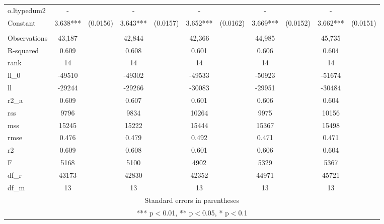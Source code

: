 \documentclass[]{article}
\begin{document}
\begin{tabular}{lcccccccccc}
o.ltypedum2 & - &  & - &  & - &  & - &  & - &  \\
Constant & 3.638*** & (0.0156) & 3.643*** & (0.0157) & 3.652*** & (0.0162) & 3.669*** & (0.0152) & 3.662*** & (0.0151) \\
 &  &  &  &  &  &  &  &  &  &  \\
Observations & 43,187 &  & 42,844 &  & 42,366 &  & 44,985 &  & 45,735 &  \\
R-squared & 0.609 &  & 0.608 &  & 0.601 &  & 0.606 &  & 0.604 &  \\
rank & 14 &  & 14 &  & 14 &  & 14 &  & 14 &  \\
ll\_0 & -49510 &  & -49302 &  & -49533 &  & -50923 &  & -51674 &  \\
ll & -29244 &  & -29266 &  & -30083 &  & -29951 &  & -30484 &  \\
r2\_a & 0.609 &  & 0.607 &  & 0.601 &  & 0.606 &  & 0.604 &  \\
rss & 9796 &  & 9834 &  & 10264 &  & 9975 &  & 10156 &  \\
mss & 15245 &  & 15222 &  & 15444 &  & 15367 &  & 15498 &  \\
rmse & 0.476 &  & 0.479 &  & 0.492 &  & 0.471 &  & 0.471 &  \\
r2 & 0.609 &  & 0.608 &  & 0.601 &  & 0.606 &  & 0.604 &  \\
F & 5168 &  & 5100 &  & 4902 &  & 5329 &  & 5367 &  \\
df\_r & 43173 &  & 42830 &  & 42352 &  & 44971 &  & 45721 &  \\
 df\_m & 13 &  & 13 &  & 13 &  & 13 &  & 13 &  \\ \hline
\multicolumn{11}{c}{ Standard errors in parentheses} \\
\multicolumn{11}{c}{ *** p$<$0.01, ** p$<$0.05, * p$<$0.1} \\
\end{tabular}
\end{document}
